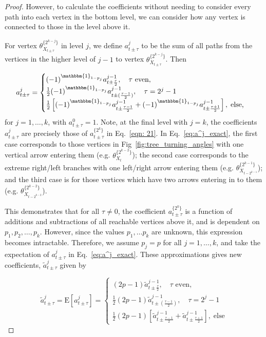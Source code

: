 \documentclass[english]{article}
\newcommand{\E}{\mathrm{E}}
\begin{document}
\begin{proof}
However, to calculate the coefficients without needing to consider every path into each vertex in the bottom level, we can consider how any vertex is connected to those in the level above it. 

For vertex $\theta_{X_{t\pm\tau}}^{\{2^{k-j}\}}$ in level $j$, we define $a^j_{t\pm\tau}$ to be the sum of all paths from the vertices in the higher level of $j-1$ to vertex $\theta_{X_{t\pm\tau}}^{\{2^{k-j}\}}$. Then

\begin{equation} \label{eq:a^j_exact}
    a^{j}_{t\pm\tau}=
\begin{cases}
    (-1)^{\mathbbm{1}_{1-p_j}}a^{j-1}_{t\pm\frac{\tau}{2}},\quad\tau\text{ even},\\
    \frac{1}{2}(-1)^{\mathbbm{1}_{1-p_j}}a^{j-1}_{t\pm(\frac{\tau -1}{2})},\quad \tau=2^{j}-1\\
    \frac{1}{2}\left[(-1)^{\mathbbm{1}_{1-p_j}}a^{j-1}_{t\pm\frac{\tau-1}{2}}+(-1)^{\mathbbm{1}_{1-p_j}}a^{{j-1}}_{t\pm\frac{\tau+1}{2}}\right],\; \text{else,}    
\end{cases}
\end{equation}
for $j=1,\dots, k$, with $a^0_{t\pm\tau}=1$.  Note, at the final level with $j=k$, the coefficients $a^{j}_{t\pm\tau}$ are precisely those of $a^{\{2^k\}}_{t\pm\tau}$ in Eq.~\ref{eqn: 21}.  
In Eq.~\ref{eq:a^j_exact}, the first case corresponds to those vertices in Fig~\ref{fig:tree_turning_angles} with one vertical arrow entering them (e.g. $\theta_{X_t}^{\{2^{k-2}\}}$); the second case corresponds to the extreme right/left branches with one left/right arrow entering them (e.g. $\theta_{X_{t-2^{k-1}}}^{\{2^{k-1}\}}$); and the third case is for those vertices which have two arrows entering in to them (e.g. $\theta_{X_{t-2^{k-2}}}^{\{2^{k-2}\}}$).

This demonstrates that for all $\tau\neq0$, the coefficient $a^{\{2^k\}}_{t\pm\tau}$ is a function of additions and subtractions of all reachable vertices above it, and is dependent on $p_1, p_2, \ldots,p_k$. However, since the values $p_1,\dots p_k$ are unknown, this expression becomes intractable.  Therefore, we assume $p_j=p$ for all $j=1,\dots, k$, and take the expectation of  $a^j_{t\pm\tau}$ in Eq.~\ref{eq:a^j_exact}.  These approximations gives new coefficients, $\tilde{a}^j_{t\pm\tau}$ given by 


\begin{equation}  \label{eq:exp_a-tilde}
   \tilde{a}^{j}_{t\pm\tau}= \E\left[a^{j}_{t\pm\tau}\right]=
\begin{cases}
    (2p-1)\tilde{a}^{j-1}_{t\pm\frac{\tau}{2}},\quad\tau\text{ even},\\
    \frac{1}{2}(2p-1)\tilde{a}^{j-1}_{t\pm(\frac{\tau -1}{2})},\quad \tau=2^{j}-1\\
    \frac{1}{2}(2p-1)\left[\tilde{a}^{j-1}_{t\pm\frac{\tau-1}{2}}+\tilde{a}^{j-1}_{t\pm\frac{\tau+1}{2}}\right],\; \text{else}    
\end{cases}
\end{equation}



\end{proof}
\end{document}

